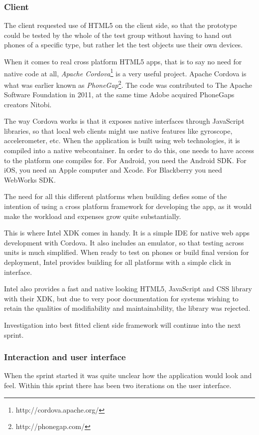 \documentclass[11pt]{book}
\begin{document}
\subsubsection{Client}
The client requested use of HTML5 on the client side, so that the prototype could be tested by the whole of the test group without having to hand out phones of a specific type, but rather let the test objects use their own devices.

When it comes to real cross platform HTML5 apps, that is to say no need for native code at all, \emph{Apache Cordova}\footnote{http://cordova.apache.org/} is a very useful project. Apache Cordova is what was earlier known as \emph{PhoneGap}\footnote{http://phonegap.com/}.\cite{phonegap} The code was contributed to The Apache Software Foundation in 2011, at the same time Adobe acquired PhoneGaps creators Nitobi.

The way Cordova works is that it exposes native interfaces through JavaScript libraries, so that local web clients might use native features like gyroscope, accelerometer, etc. When the application is built using web technologies, it is compiled into a native webcontainer. In order to do this, one needs to have access to the platform one compiles for. For Android, you need the Android SDK. For iOS, you need an Apple computer and Xcode. For Blackberry you need WebWorks SDK.

The need for all this different platforms when building defies some of the intention of using a cross platform framework for developing the app, as it would make the workload and expenses grow quite substantially.

This is where Intel XDK comes in handy. It is a simple IDE for native web apps development with Cordova. It also includes an emulator, so that testing across units is much simplified. When ready to test on phones or build final version for deployment, Intel provides building for all platforms with a simple click in interface.

Intel also provides a fast and native looking HTML5, JavaScript and CSS library with their XDK, but due to very poor documentation for systems wishing to retain the qualities of modifiability and maintainability, the library was rejected.

Investigation into best fitted client side framework will continue into the next sprint.

\subsubsection{Interaction and user interface}
When the sprint started it was quite unclear how the application would look and feel. Within this sprint there has been two iterations on the user interface.
\end{document}
